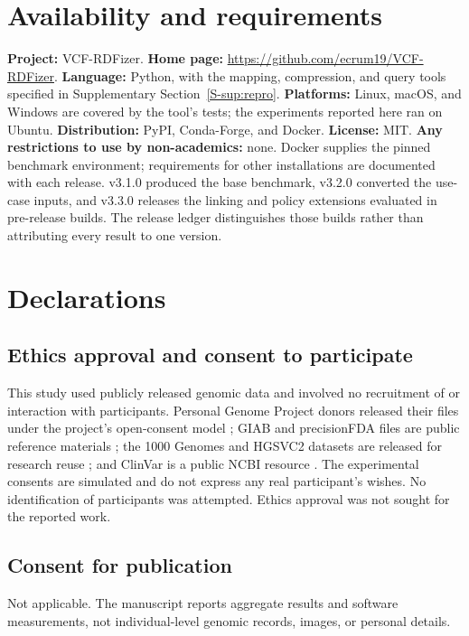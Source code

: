\documentclass[pdflatex,sn-mathphys-num]{sn-jnl}
\begin{document}
\section*{Availability and requirements}
\textbf{Project:} VCF-RDFizer. 
\textbf{Home page:} \url{https://github.com/ecrum19/VCF-RDFizer}. 
\textbf{Language:} Python, with the mapping, compression, and query tools specified in Supplementary Section~\ref{S-sup:repro}. 
\textbf{Platforms:} Linux, macOS, and Windows are covered by the tool's tests; the experiments reported here ran on Ubuntu. 
\textbf{Distribution:} PyPI, Conda-Forge, and Docker. 
\textbf{License:} MIT. \textbf{Any restrictions to use by non-academics:} none. Docker supplies the pinned benchmark environment; requirements for other installations are documented with each release. 
v3.1.0 produced the base benchmark, v3.2.0 converted the use-case inputs, and v3.3.0 releases the linking and policy extensions evaluated in pre-release builds. 
The release ledger distinguishes those builds rather than attributing every result to one version.

\section*{Declarations}
\subsection*{Ethics approval and consent to participate}
This study used publicly released genomic data and involved no recruitment of or interaction with participants. 
Personal Genome Project donors released their files under the project's open-consent model \cite{personal_genome_proj}; GIAB and precisionFDA files are public reference materials \cite{nist_gib_2025,giab_v421_2022}; the 1000 Genomes and HGSVC2 datasets are released for research reuse \cite{thousand_genomes_2015,byrska2022highcoverage,hgsvc_2021}; and ClinVar is a public NCBI resource \cite{clinvar_vcf}. 
The experimental consents are simulated and do not express any real participant's wishes. 
No identification of participants was attempted. Ethics approval was not sought for the reported work.

\subsection*{Consent for publication}
Not applicable. 
The manuscript reports aggregate results and software measurements, not individual-level genomic records, images, or personal details.
\end{document}
